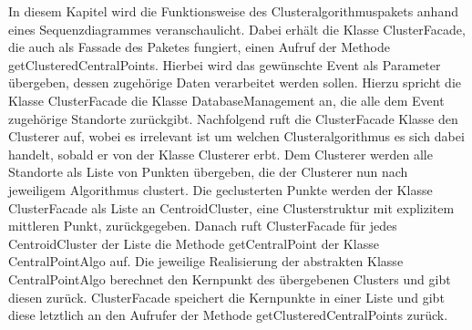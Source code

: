 \begin {center}
\end {center}

In diesem Kapitel wird die Funktionsweise des Clusteralgorithmuspakets anhand eines Sequenzdiagrammes veranschaulicht. Dabei erhält die Klasse ClusterFacade, die auch als Fassade des Paketes fungiert, einen Aufruf der Methode getClusteredCentralPoints. Hierbei wird das gewünschte Event als Parameter übergeben, dessen zugehörige Daten verarbeitet werden sollen. Hierzu spricht die Klasse ClusterFacade die Klasse DatabaseManagement an, die alle dem Event zugehörige Standorte zurückgibt. Nachfolgend ruft die ClusterFacade Klasse den Clusterer auf, wobei es irrelevant ist um welchen Clusteralgorithmus es sich dabei handelt, sobald er von der Klasse Clusterer erbt. Dem Clusterer werden alle Standorte als Liste von Punkten übergeben, die der Clusterer nun nach jeweiligem Algorithmus clustert. Die geclusterten Punkte werden der Klasse ClusterFacade als Liste an CentroidCluster, eine Clusterstruktur mit explizitem mittleren Punkt, zurückgegeben. Danach ruft ClusterFacade für jedes CentroidCluster der Liste die Methode getCentralPoint der Klasse CentralPointAlgo auf. Die jeweilige Realisierung der abstrakten Klasse CentralPointAlgo berechnet den Kernpunkt des übergebenen Clusters und gibt diesen zurück. ClusterFacade speichert die Kernpunkte in einer Liste und gibt diese letztlich an den Aufrufer der Methode getClusteredCentralPoints zurück. 
	
	\newpage
